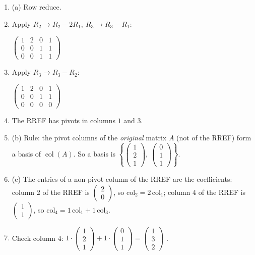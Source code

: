 \documentclass[11pt]{article}
\begin{document}
\begin{tcolorbox}[breakable,colback=ans,colframe=ansb,boxrule=0.5pt,left=4pt,right=4pt,top=2pt,bottom=2pt]\begin{enumerate}[leftmargin=2.2em,itemsep=1pt,topsep=1pt,label=\textbf{Step \arabic*.}]\item (a) Row reduce.
\item Apply $R_2\to R_2-2R_1,\ R_3\to R_3-R_1$:\par\smallskip $\displaystyle \begin{pmatrix}1 & 2 & 0 & 1 \\ 0 & 0 & 1 & 1 \\ 0 & 0 & 1 & 1\end{pmatrix}$
\item Apply $R_3\to R_3-R_2$:\par\smallskip $\displaystyle \begin{pmatrix}1 & 2 & 0 & 1 \\ 0 & 0 & 1 & 1 \\ 0 & 0 & 0 & 0\end{pmatrix}$
\item The RREF has pivots in columns $1$ and $3$.
\item (b) Rule: the pivot columns of the \emph{original} matrix $A$ (not of the RREF) form a basis of $\operatorname{col}(A)$. So a basis is $\left\{\begin{pmatrix}1\\2\\1\end{pmatrix},\ \begin{pmatrix}0\\1\\1\end{pmatrix}\right\}$.
\item (c) The entries of a non-pivot column of the RREF are the coefficients: column 2 of the RREF is $\begin{pmatrix}2\\0\end{pmatrix}$, so $\text{col}_2=2\,\text{col}_1$; column 4 of the RREF is $\begin{pmatrix}1\\1\end{pmatrix}$, so $\text{col}_4=1\,\text{col}_1+1\,\text{col}_3$.
\item Check column 4: $1\cdot\begin{pmatrix}1\\2\\1\end{pmatrix}+1\cdot\begin{pmatrix}0\\1\\1\end{pmatrix}=\begin{pmatrix}1\\3\\2\end{pmatrix}$ \checkmark.

\end{enumerate}
\end{tcolorbox}
\end{document}
